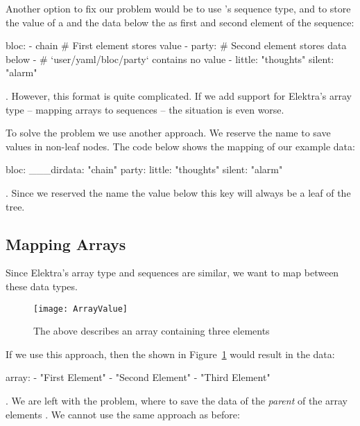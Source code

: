 Another option to fix our problem would be to use ’s sequence type, and to store the value of a  and the data below the  as first and second element of the sequence:

\begin{yamlcode}
  bloc:
    - chain                 # First element stores value
    - party:                # Second element stores data below
      -                     # `user/yaml/bloc/party` contains no value
      - little: "thoughts"
        silent: "alarm"
\end{yamlcode}

. However, this format is quite complicated. If we add support for Elektra’s array type – mapping arrays to  sequences – the situation is even worse.

To solve the problem we use another approach. We reserve the name  to save values in non-leaf nodes. The code below shows the mapping of our example data:

\begin{yamlcode}
  bloc:
    ___dirdata: "chain"
    party:
      little: "thoughts"
      silent: "alarm"
\end{yamlcode}

. Since we reserved the name  the value below this key will always be a leaf of the tree.

\subsection{Mapping Arrays}

Since Elektra’s array type and  sequences are similar, we want to map between these data types.

\begin{figure}
  \centering
    \texttt{[image: ArrayValue]}
  \caption{The  above describes an array containing three elements}
  \label{fig:array_value}
\end{figure}

If we use this approach, then the  shown in Figure~\ref{fig:array_value} would result in the  data:

\begin{yamlcode}
  array:
    - "First Element"
    - "Second Element"
    - "Third Element"
\end{yamlcode}

. We are left with the problem, where to save the data of the \emph{parent}  of the array elements . We cannot use the same approach as before:

